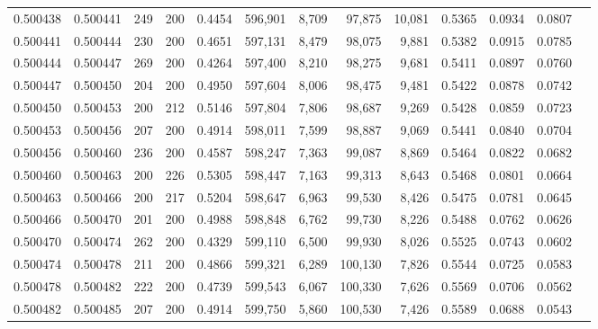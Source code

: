 \begin{tabular}{rrrrrrrrrrrrr}
0.500438 & 0.500441 &    249 & 200 &                                     0.4454 & 596,901 &   8,709 &  97,875 &  10,081 & 0.5365 & 0.0934 & 0.0807 \\
0.500441 & 0.500444 &    230 & 200 &                                     0.4651 & 597,131 &   8,479 &  98,075 &   9,881 & 0.5382 & 0.0915 & 0.0785 \\
0.500444 & 0.500447 &    269 & 200 &                                     0.4264 & 597,400 &   8,210 &  98,275 &   9,681 & 0.5411 & 0.0897 & 0.0760 \\
0.500447 & 0.500450 &    204 & 200 &                                     0.4950 & 597,604 &   8,006 &  98,475 &   9,481 & 0.5422 & 0.0878 & 0.0742 \\
0.500450 & 0.500453 &    200 & 212 &                                     0.5146 & 597,804 &   7,806 &  98,687 &   9,269 & 0.5428 & 0.0859 & 0.0723 \\
0.500453 & 0.500456 &    207 & 200 &                                     0.4914 & 598,011 &   7,599 &  98,887 &   9,069 & 0.5441 & 0.0840 & 0.0704 \\
0.500456 & 0.500460 &    236 & 200 &                                     0.4587 & 598,247 &   7,363 &  99,087 &   8,869 & 0.5464 & 0.0822 & 0.0682 \\
0.500460 & 0.500463 &    200 & 226 &                                     0.5305 & 598,447 &   7,163 &  99,313 &   8,643 & 0.5468 & 0.0801 & 0.0664 \\
0.500463 & 0.500466 &    200 & 217 &                                     0.5204 & 598,647 &   6,963 &  99,530 &   8,426 & 0.5475 & 0.0781 & 0.0645 \\
0.500466 & 0.500470 &    201 & 200 &                                     0.4988 & 598,848 &   6,762 &  99,730 &   8,226 & 0.5488 & 0.0762 & 0.0626 \\
0.500470 & 0.500474 &    262 & 200 &                                     0.4329 & 599,110 &   6,500 &  99,930 &   8,026 & 0.5525 & 0.0743 & 0.0602 \\
0.500474 & 0.500478 &    211 & 200 &                                     0.4866 & 599,321 &   6,289 & 100,130 &   7,826 & 0.5544 & 0.0725 & 0.0583 \\
0.500478 & 0.500482 &    222 & 200 &                                     0.4739 & 599,543 &   6,067 & 100,330 &   7,626 & 0.5569 & 0.0706 & 0.0562 \\
0.500482 & 0.500485 &    207 & 200 &                                     0.4914 & 599,750 &   5,860 & 100,530 &   7,426 & 0.5589 & 0.0688 & 0.0543 \\

\end{tabular}
